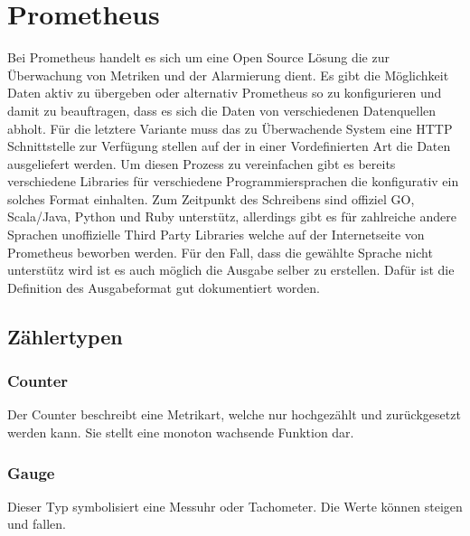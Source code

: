 \section{Prometheus}
Bei Prometheus handelt es sich um eine Open Source Lösung die zur Überwachung von Metriken und der Alarmierung dient. Es gibt die Möglichkeit Daten aktiv zu übergeben oder alternativ Prometheus so zu konfigurieren und damit zu beauftragen, dass es sich die Daten von verschiedenen Datenquellen abholt. Für die letztere Variante muss das zu Überwachende System eine HTTP Schnittstelle zur Verfügung stellen auf der in einer Vordefinierten Art die Daten ausgeliefert werden. Um diesen Prozess zu vereinfachen gibt es bereits verschiedene Libraries für verschiedene Programmiersprachen die konfigurativ ein solches Format einhalten. Zum Zeitpunkt des Schreibens sind offiziel GO, Scala/Java, Python und Ruby unterstütz, allerdings gibt es für zahlreiche andere Sprachen unoffizielle Third Party Libraries welche auf der Internetseite von Prometheus beworben werden. Für den Fall, dass die gewählte Sprache nicht unterstütz wird ist es auch möglich die Ausgabe selber zu erstellen. Dafür ist die Definition des Ausgabeformat gut dokumentiert worden. 
\subsection{Zählertypen}
\subsubsection{Counter}
Der Counter beschreibt eine Metrikart, welche nur hochgezählt und zurückgesetzt werden kann. Sie stellt eine monoton wachsende Funktion dar. 
\subsubsection{Gauge}
Dieser Typ symbolisiert eine Messuhr oder Tachometer. Die Werte können steigen und fallen.

